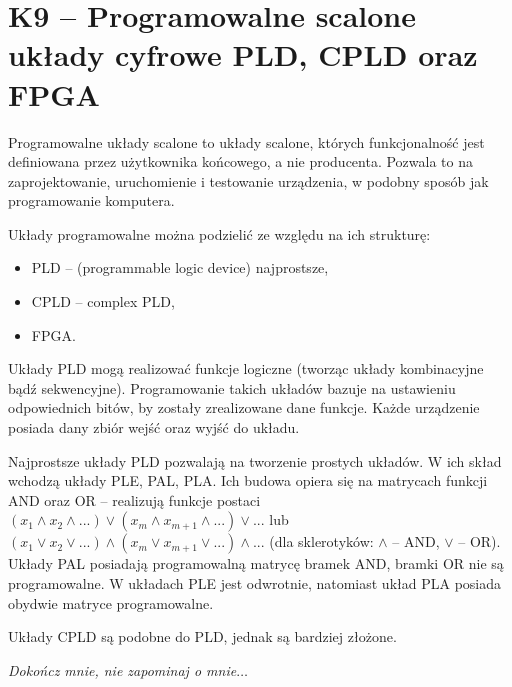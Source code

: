 \sloppy\section{K9 -- Programowalne scalone układy cyfrowe PLD, CPLD oraz FPGA}

Programowalne układy scalone to układy scalone, których funkcjonalność jest definiowana przez użytkownika końcowego, a nie producenta. Pozwala to na zaprojektowanie, uruchomienie i testowanie urządzenia, w podobny sposób jak programowanie komputera.

Układy programowalne można podzielić ze względu na ich strukturę:
\begin{itemize}
\item PLD -- (programmable logic device) najprostsze,
\item CPLD -- complex PLD,
\item FPGA.
\end{itemize}

Układy PLD mogą realizować funkcje logiczne (tworząc układy kombinacyjne bądź sekwencyjne). Programowanie takich układów bazuje na ustawieniu odpowiednich bitów, by zostały zrealizowane dane funkcje. Każde urządzenie posiada dany zbiór wejść oraz wyjść do układu.

Najprostsze układy PLD pozwalają na tworzenie prostych układów. W ich skład wchodzą układy PLE, PAL, PLA. Ich budowa opiera się na matrycach funkcji AND oraz OR -- realizują funkcje postaci $(x_{1} \wedge x_{2} \wedge ...) \vee (x_{m} \wedge x_{m+1} \wedge ...) \vee ...$ lub $(x_{1} \vee x_{2} \vee ...) \wedge (x_{m} \vee x_{m+1} \vee ...) \wedge ...$ (dla sklerotyków: $\wedge$ -- AND, $\vee$ -- OR). Układy PAL posiadają programowalną matrycę bramek AND, bramki OR nie są programowalne. W układach PLE jest odwrotnie, natomiast układ PLA posiada obydwie matryce programowalne.

Układy CPLD są podobne do PLD, jednak są bardziej złożone. 

\textit{Dokończ mnie, nie zapominaj o mnie$\ldots$}
